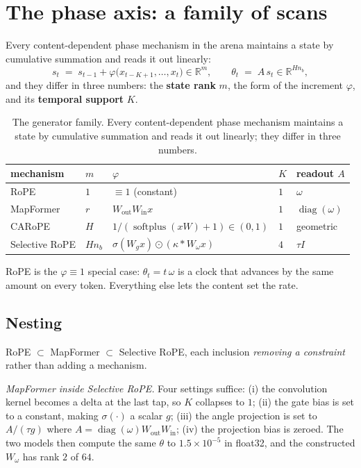 \documentclass[11pt]{article}
\newcommand{\R}{\mathbb{R}}
\newcommand{\nb}{n_b}
\DeclareMathOperator{\softplus}{softplus}
\begin{document}
\section{The phase axis: a family of scans}
\label{sec:phase}

Every content-dependent phase mechanism in the arena maintains a state by
cumulative summation and reads it out linearly:
\begin{equation}
  \label{eq:gen}
  s_t \;=\; s_{t-1} + \varphi\big(x_{t-K+1},\dots,x_t\big) \in \R^m,
  \qquad
  \theta_t \;=\; A\,s_t \in \R^{H\nb},
\end{equation}
and they differ in three numbers: the \textbf{state rank} $m$, the form of the
increment $\varphi$, and its \textbf{temporal support} $K$.

\begin{table}[htbp]\centering\small
\caption{The generator family. Every content-dependent phase mechanism maintains a state by cumulative summation and reads it out linearly; they differ in three numbers.}
\label{tab:gen}
\begin{tabular}{lllll}
\toprule
mechanism & $m$ & $\varphi$ & $K$ & readout $A$ \\
\midrule
RoPE           & $1$    & $\equiv 1$ (constant)                   & $1$ & $\omega$ \\
MapFormer      & $r$    & $W_{\mathrm{out}}W_{\mathrm{in}}x$      & $1$ & $\operatorname{diag}(\omega)$ \\
CARoPE         & $H$    & $1/(\softplus(xW)+1) \in (0,1)$         & $1$ & geometric \\
Selective RoPE & $H\nb$ & $\sigma(W_gx)\odot(\kappa * W_\omega x)$ & $4$ & $\tau I$ \\
\bottomrule
\end{tabular}
\end{table}

\noindent RoPE is the $\varphi \equiv 1$ special case: $\theta_t = t\,\omega$ is a
clock that advances by the same amount on every token. Everything else lets the
content set the rate.

\subsection{Nesting}
\label{sec:incl}

RoPE $\subset$ MapFormer $\subset$ Selective RoPE, each inclusion \emph{removing a
constraint} rather than adding a mechanism.

\medskip
\noindent\emph{MapFormer inside Selective RoPE.} Four settings suffice: (i) the
convolution kernel becomes a delta at the last tap, so $K$ collapses to $1$; (ii)
the gate bias is set to a constant, making $\sigma(\cdot)$ a scalar $g$; (iii) the
angle projection is set to
$A/(\tau g)$ where $A = \operatorname{diag}(\omega)W_{\mathrm{out}}W_{\mathrm{in}}$;
(iv) the projection bias is zeroed. The two models then compute the same $\theta$ to
$1.5\times10^{-5}$ in float32, and the constructed $W_\omega$ has rank $2$ of $64$.
\end{document}
